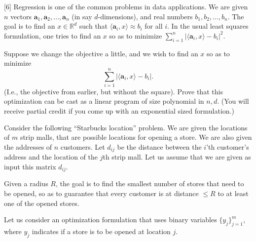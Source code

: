 \documentclass[addpoints]{exam}
\begin{document}
\begin{questions}

\newcommand{\ba}{\mathbf{a}}
\newcommand{\R}{\mathbb{R}}
\newcommand{\iprod}[1]{\langle #1 \rangle}

[6]
Regression is one of the common problems in data applications.  We are given $n$ vectors $\ba_1, \ba_2, \dots, \ba_n$ (in say $d$-dimensions), and real numbers $b_1, b_2, \dots, b_n$.  The goal is to find an $x \in \R^d$ such that $\iprod{\ba_i, x} \approx b_i$ for all $i$. In the usual least squares formulation, one tries to find an $x$ so as to minimize $\sum_{i=1}^n | \iprod{\ba_i, x} - b_i|^2$.

Suppose we change the objective a little, and we wish to find an $x$ so as to minimize
\[ \sum_{i=1}^n | \iprod{\ba_i, x} - b_i|. \]
(I.e., the objective from earlier, but without the square).  Prove that this optimization can be cast as a linear program of size polynomial in $n, d$.  (You will receive partial credit if you come up with an exponential sized formulation.)

Consider the following ``Starbucks location'' problem. We are given the locations of $m$ strip malls, that are possible locations for opening a store.  We are also given the addresses of $n$ customers.  Let $d_{ij}$ be the distance between the $i$'th customer's address and the location of the $j$th strip mall. Let us assume that we are given as input this matrix $d_{ij}$.

Given a radius $R$, the goal is to find the smallest number of stores that need to be opened, so as to guarantee that every customer is at distance $\le R$ to at least one of the opened stores.

Let us consider an optimization formulation that uses binary variables $\{y_j\}_{j = 1}^m$, where $y_j$ indicates if a store is to be opened at location $j$.
\end{questions}
\end{document}
